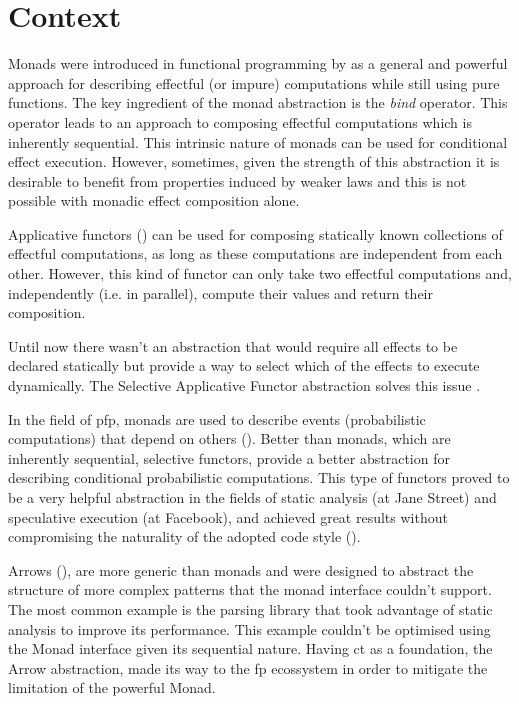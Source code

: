 \documentclass[
  oneside,
  11pt, a4paper,
  footinclude=true,
  headinclude=true,
  cleardoublepage=empty
]{scrbook}
\theoremstyle{definition}
\theoremstyle{definition}
\begin{document}
    \section{Context}\label{sec-context}
    
    Monads were introduced in functional programming by \cite{1995_wadler_monads} as a general and powerful approach for describing effectful (or impure) computations while still using pure functions. The key ingredient of the monad abstraction is the \textit{bind} operator. This operator leads to an approach to composing effectful computations which is inherently sequential. This intrinsic nature of monads can be used for conditional effect execution. However, sometimes, given the strength of this abstraction it is desirable to benefit from properties induced by weaker laws and this is not possible with monadic effect composition alone.

    Applicative functors (\cite{mcbride2008applicative}) can be used for composing statically known collections of effectful computations, as long as these computations are independent from each other. However, this kind of functor can only take two effectful computations and, independently (i.e. in parallel), compute their values and return their composition.

    Until now there wasn't an abstraction that would require all effects to be declared statically but provide a way to select which of the effects to execute dynamically. The Selective Applicative Functor abstraction solves this issue \cite{andrey2019selective}.

    In the field of \gls{pfp}, monads are used to describe events (probabilistic computations) that depend on others (\cite{erwig_kollmansberger_2006}). Better than monads, which are inherently sequential, selective functors, provide a better abstraction for describing conditional probabilistic computations. This type of functors proved to be a very helpful abstraction in the fields of static analysis (at Jane Street) and speculative execution (at Facebook), and achieved great results without compromising the naturality of the adopted code style (\cite{andrey2019selective}).
    
    Arrows (\cite{Hughes:2000:GMA:347238.347246}), are more generic than monads and were designed to abstract the structure of more complex patterns that the monad interface couldn't support. The most common example is the \cite{swiestra&duponcheel} parsing library that took advantage of static analysis to improve its performance. This example couldn't be optimised using the Monad interface given its sequential nature. Having \gls{ct} as a foundation, the Arrow abstraction, made its way to the \gls{fp} ecossystem in order to mitigate the limitation of the powerful Monad.
    
\end{document}
